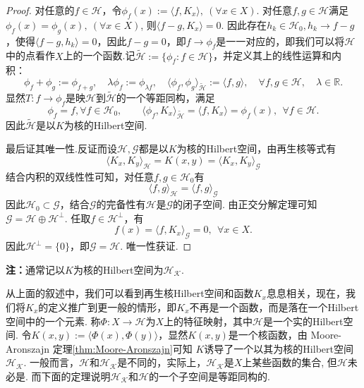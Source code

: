 \documentclass[12pt, a4paper, oneside]{ctexbook}
\begin{document}
\begin{proof}
    对任意的$f\in\mathcal{H}$，令$\phi_f(x):=\langle f,K_x\rangle,~(\forall x\in X)$. 对任意$f,g\in\mathcal{H}$满足$\phi_f(x)=\phi_g(x),~(\forall x\in X)$, 则$\langle f-g,K_x\rangle=0$. 因此存在$h_k\in\mathcal{H}_0,h_k\to f-g$，使得$\langle f-g,  h_k\rangle=0$，因此$f-g=0$，即$f\to \phi_f$是一一对应的，即我们可以将$\mathcal{H}$中的点看作$X$上的一个函数.记$\widetilde{\mathcal{H}}:=\{\phi_f:f\in\mathcal{H}\}$，并定义其上的线性运算和内积：
    \begin{equation*}
        \phi_{f}+\phi_{g}:=\phi_{f+g},\quad\lambda\phi_{f}:=\phi_{\lambda f},\quad\langle\phi_{f},\phi_{g}\rangle_{\widetilde{\mathcal{H}}}:=\langle f,g\rangle,\quad\forall f,g\in \mathcal{H},\quad\lambda\in\mathbb{R}.
    \end{equation*}
    显然$T:f\to\phi_f$是映$\mathcal{H}$到$\widetilde{\mathcal{H}}$的一个等距同构，满足
    \begin{equation*}
        \phi_{f}=f,\forall f\in \mathcal{H}_{0},\quad\quad\langle\phi_{f},K_x\rangle_{\widetilde{\mathcal{H}}}=\langle f,K_x\rangle=\phi_{f}(x),~~\forall f\in \mathcal{H}.
    \end{equation*}
因此$\widetilde{\mathcal{H}}$是以$K$为核的Hilbert空间.

最后证其唯一性.反证而设$\mathcal{H},\mathcal{G}$都是以$K$为核的Hilbert空间，由再生核等式有
\begin{equation*}
    \langle K_x,K_y\rangle_{\mathcal{H}}=K(x,y)=\langle K_x,K_y\rangle_{\mathcal{G}}
\end{equation*}
结合内积的双线性性可知，对任意$f,g\in \mathcal{H}_0$有
\begin{equation*}
    \langle f,g\rangle_{\mathcal{H}}=\langle f,g\rangle_{\mathcal{G}}
\end{equation*}
因此$\mathcal{H}_0\subset \mathcal{G}$，结合$\mathcal{G}$的完备性有$\mathcal{H}$是$\mathcal{G}$的闭子空间. 由正交分解定理可知$\mathcal{G}=\mathcal{H}\oplus\mathcal{H}^{\perp}$. 任取$f\in\mathcal{H}^\perp$，有
\begin{equation*}
    f(x)=\langle f,K_x\rangle_{\mathcal{G}}=0,~~\forall x\in X.
\end{equation*}
因此$\mathcal{H}^{\perp}=\{0\}$，即$\mathcal{G}=\mathcal{H}$. 唯一性获证.
\end{proof}

\textbf{注：}通常记以$K$为核的Hilbert空间为$\mathcal{H_K}$.

从上面的叙述中，我们可以看到再生核Hilbert空间和函数$K_x$息息相关，现在，我们将$K_x$的定义推广到更一般的情形，即$K_x$不再是一个函数，而是落在一个Hilbert空间中的一个元素. 称$\Phi:X\to\mathcal{H}$为$X$上的特征映射，其中$\mathcal{H}$是一个实的Hilbert空间. 令$K(x,y):=\langle \Phi(x),\Phi(y)\rangle$，显然$K(x,y)$是一个核函数，由 Moore-Aronszajn 定理\ref{thm:Moore-Aronszajn}可知 $K$诱导了一个以其为核的Hilbert空间$\mathcal{H_K}$. 一般而言，$\mathcal{H}$和$\mathcal{H_K}$是不同的，实际上，$\mathcal{H_K}$是$X$上某些函数的集合, 但$\mathcal{H}$未必是. 而下面的定理说明$\mathcal{H_K}$和$\mathcal{H}$的一个子空间是等距同构的.
\end{document}

